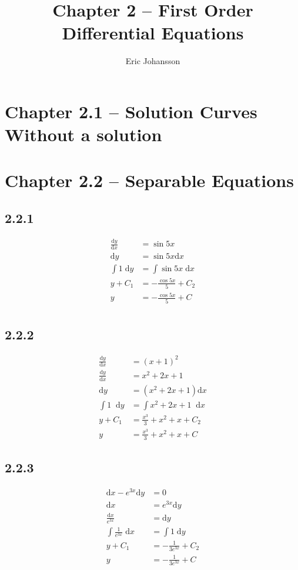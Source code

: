\documentclass{article}
\title{Chapter 2 -- First Order Differential Equations}
\author{Eric Johansson}
\newcommand*\dif{\mathop{}\!\mathrm{d}}
\begin{document}
\maketitle
\tableofcontents
\newpage
\section{Chapter 2.1 -- Solution Curves Without a solution} 
\subsection{}

\section{Chapter 2.2 -- Separable Equations} 

\subsection{2.2.1}
    \begin{align*}
        \frac{\mathrm{d}y}{\mathrm{d}x} &= \sin 5x \\
        \mathrm{d}y &= \sin 5x \mathrm{d}x \\
        \int 1 \; \mathrm{d}y  &= \int \sin 5x \; \mathrm{d}x \\
        y+C_1  &= -\frac{ \cos 5x}{5} + C_2 \\
        y &= -\frac{\cos 5x}{5}+C \\
    \end{align*}

\subsection{2.2.2}
\begin{align*}
    \frac{\mathrm{d}y}{\mathrm{d}x} &= \left(x+1\right)^2 \\
    \frac{\mathrm{d}y}{\mathrm{d}x} &= x^2+2x+1 \\
    \mathrm{d}y &= (x^2+2x+1) \mathrm{d}x \\
    \int 1 \dif y  &= \int x^2+2x+1 \dif x \\
    y+C_1  &=  \frac{x^3}{3}+x^2+x+C_2 \\
    y &= \frac{x^3}{3}+x^2+x+C
\end{align*}

\subsection{2.2.3}
\begin{align*}
    \mathrm{d}x-e^{3x}\mathrm{d}y &= 0 \\
    \mathrm{d}x &= e^{3x}\mathrm{d}y \\
    \frac{\mathrm{d}x}{e^{3x}} &= \mathrm{d}y \\
    \int \frac{1}{e^{3x}} \; \mathrm{d}x &= \int 1 \; \mathrm{d}y \\
    y+C_1 &= -\frac{1}{3e^{3x}}+C_2 \\
    y  &=  -\frac{1}{3e^{3x}}+C
\end{align*}
\end{document}
